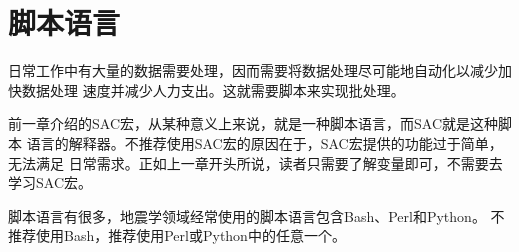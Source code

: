 \section{脚本语言}
日常工作中有大量的数据需要处理，因而需要将数据处理尽可能地自动化以减少加快数据处理
速度并减少人力支出。这就需要脚本来实现批处理。

前一章介绍的SAC宏，从某种意义上来说，就是一种脚本语言，而SAC就是这种脚本
语言的解释器。不推荐使用SAC宏的原因在于，SAC宏提供的功能过于简单，无法满足
日常需求。正如上一章开头所说，读者只需要了解变量即可，不需要去学习SAC宏。

脚本语言有很多，地震学领域经常使用的脚本语言包含Bash、Perl和Python。
不推荐使用Bash，推荐使用Perl或Python中的任意一个。
